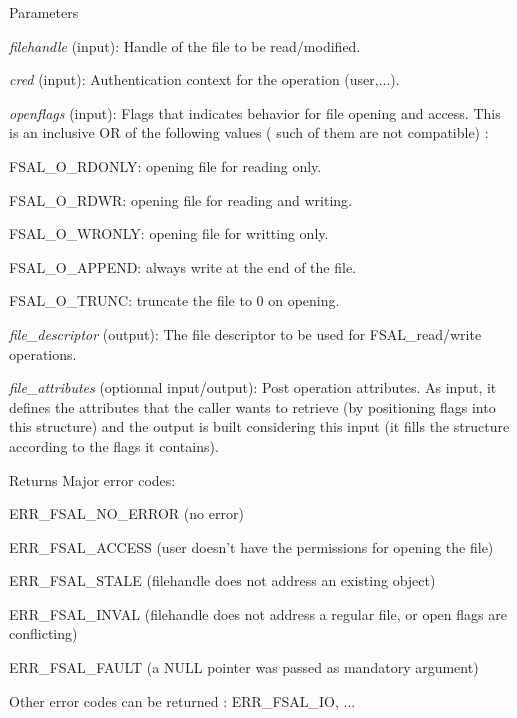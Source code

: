 \begin{DoxyParams}{Parameters}
\item[{\em filehandle}](input): Handle of the file to be read/modified. \item[{\em cred}](input): Authentication context for the operation (user,...). \item[{\em openflags}](input): Flags that indicates behavior for file opening and access. This is an inclusive OR of the following values ( such of them are not compatible) :
\begin{DoxyItemize}
\item FSAL\_\-O\_\-RDONLY: opening file for reading only.
\item FSAL\_\-O\_\-RDWR: opening file for reading and writing.
\item FSAL\_\-O\_\-WRONLY: opening file for writting only.
\item FSAL\_\-O\_\-APPEND: always write at the end of the file.
\item FSAL\_\-O\_\-TRUNC: truncate the file to 0 on opening. 
\end{DoxyItemize}\item[{\em file\_\-descriptor}](output): The file descriptor to be used for FSAL\_\-read/write operations. \item[{\em file\_\-attributes}](optionnal input/output): Post operation attributes. As input, it defines the attributes that the caller wants to retrieve (by positioning flags into this structure) and the output is built considering this input (it fills the structure according to the flags it contains).\end{DoxyParams}
\begin{DoxyReturn}{Returns}
Major error codes:
\begin{DoxyItemize}
\item ERR\_\-FSAL\_\-NO\_\-ERROR (no error)
\item ERR\_\-FSAL\_\-ACCESS (user doesn't have the permissions for opening the file)
\item ERR\_\-FSAL\_\-STALE (filehandle does not address an existing object)
\item ERR\_\-FSAL\_\-INVAL (filehandle does not address a regular file, or open flags are conflicting)
\item ERR\_\-FSAL\_\-FAULT (a NULL pointer was passed as mandatory argument)
\item Other error codes can be returned : ERR\_\-FSAL\_\-IO, ... 
\end{DoxyItemize}
\end{DoxyReturn}


